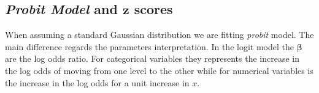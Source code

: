 \documentclass[
  man,floatsintext]{apa6}
\newenvironment{Shaded}{\begin{snugshade}}{\end{snugshade}}
\newcommand{\AttributeTok}[1]{\textcolor[rgb]{0.13,0.29,0.53}{#1}}
\newcommand{\CommentTok}[1]{\textcolor[rgb]{0.56,0.35,0.01}{\textit{#1}}}
\newcommand{\DecValTok}[1]{\textcolor[rgb]{0.00,0.00,0.81}{#1}}
\newcommand{\FunctionTok}[1]{\textcolor[rgb]{0.13,0.29,0.53}{\textbf{#1}}}
\newcommand{\NormalTok}[1]{#1}
\newcommand{\OtherTok}[1]{\textcolor[rgb]{0.56,0.35,0.01}{#1}}
\newcommand{\SpecialCharTok}[1]{\textcolor[rgb]{0.81,0.36,0.00}{\textbf{#1}}}
\newcommand{\StringTok}[1]{\textcolor[rgb]{0.31,0.60,0.02}{#1}}
\begin{document}
\begin{Shaded}
\end{Shaded}

\normalsize

\subsection{\texorpdfstring{\emph{Probit Model} and \(\mathbf{z}\) scores}{Probit Model and \textbackslash mathbf\{z\} scores}}\label{probit-model-and-mathbfz-scores}

When assuming a standard Gaussian distribution we are fitting \emph{probit} model. The main difference regards the parameters interpretation. In the logit model the \(\boldsymbol{\beta}\) are the log odds ratio. For categorical variables they represents the increase in the log odds of moving from one level to the other while for numerical variables is the increase in the log odds for a unit increase in \(x\).
\end{document}
